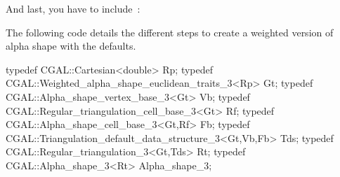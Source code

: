 And last, you have to include~:


\ccExample
The following code details the different steps to create 
a weighted version of alpha shape with the defaults.

\begin{cprog}
typedef CGAL::Cartesian<double> Rp;
typedef CGAL::Weighted_alpha_shape_euclidean_traits_3<Rp> Gt;
typedef CGAL::Alpha_shape_vertex_base_3<Gt> Vb;
typedef CGAL::Regular_triangulation_cell_base_3<Gt> Rf;
typedef CGAL::Alpha_shape_cell_base_3<Gt,Rf>  Fb;
typedef CGAL::Triangulation_default_data_structure_3<Gt,Vb,Fb> Tds;
typedef CGAL::Regular_triangulation_3<Gt,Tds> Rt;
typedef CGAL::Alpha_shape_3<Rt> Alpha_shape_3;
\end{cprog}

